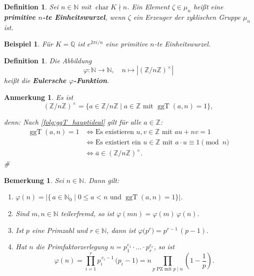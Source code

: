 \documentclass[a4paper, twoside, 11pt, ngerman]{report}
\newcommand{\NN}{\mathds N}
\newcommand{\QQ}{\mathds Q}
\newcommand{\ZZ}{\mathds Z}
\DeclareMathOperator{\charact}{char}
\DeclareMathOperator{\ggT}{ggT}
\theoremstyle{definistyle}
\newtheorem{defini}[satz]{Definition}
\newtheorem{bem}[satz]{Bemerkung}
\newtheorem{anm}[satz]{Anmerkung}
\newtheorem{bsp}[satz]{Beispiel}
\theoremstyle{remark}
\newenvironment{denn}%
  {\par\textit{denn:}}%
  {\hfill\#\par}
\newcommand{\defn}[1]{\textit{\bfseries #1}}
\begin{document}
\begin{defini}\label{def:primitive_einheitswurzel}
Sei $n \in \NN$ mit $\charact K \nmid n$. Ein Element $\zeta \in \mu_n$ heißt eine \defn{primitive $n$-te Einheitswurzel}, wenn $\zeta$ ein Erzeuger der zyklischen Gruppe $\mu_n$ ist.
\end{defini}

\begin{bsp}\label{bsp:primitive_einheitswurzel_q}
Für $K = \QQ$ ist $e^{2\pi i / n}$ eine primitive $n$-te Einheitswurzel.
\end{bsp}

\begin{defini}\label{def:eulersche_phi_funktion}
Die Abbildung 
\[
\varphi \colon \NN \to \NN, \quad n \mapsto \left|(\ZZ / n \ZZ)^\times\right|
\]
heißt die \defn{Eulersche $\varphi$-Funktion}.
\end{defini}

\begin{anm}\label{anm:Einh_mod_n}
Es ist 
\[
(\ZZ / n \ZZ)^\times = \{ a \in \ZZ / n \ZZ \mid a \in \ZZ \text{ mit } \ggT(a, n) = 1 \},
\]
\begin{denn}
Nach \ref{folg:ggT_hauptideal} gilt für alle $a \in \ZZ$:
\begin{align*}
\ggT(a, n) = 1 &\iff \text{Es existieren } u, v \in \ZZ \text{ mit } au + nv = 1  \\
&\iff \text{Es existiert ein } u \in \ZZ \text{ mit }a \cdot u \equiv 1 \pmod{n} \\
& \iff \overline{a} \in (\ZZ / n \ZZ)^\times.
\end{align*}
\end{denn}
\end{anm}

\begin{bem}\label{bem:euler_phi}
Sei $n \in \NN$. Dann gilt:
\begin{enumerate}
\item[(a)] $\varphi(n) = |\{\,a \in \NN_0 \mid 0 \le a < n \text{ und } \ggT(a,n) = 1\}|$.
\item[(b)] Sind $m,n \in \NN$ teilerfremd, so ist $\varphi(mn) = \varphi(m)\,\varphi(n).$
\item[(c)] Ist $p$ eine Primzahl und $r \in \NN$, dann ist $\varphi\bigl(p^r\bigr) = p^{r-1}\,(p-1).$
\item[(d)] Hat $n$ die Primfaktorzerlegung $n = p_{1}^{e_{1}}\cdot\ldots\cdot p_{r}^{e_{r}}$, so ist
\[
  \varphi(n) = \prod_{i=1}^{r} p_{i}^{\,e_{i}-1}\,\bigl(p_{i}-1\bigr) =n\prod_{p\text{ PZ mit }p\mid n}\left(1-\frac{1}{p}\right).
\]
\end{enumerate}
\end{bem}
\end{document}

